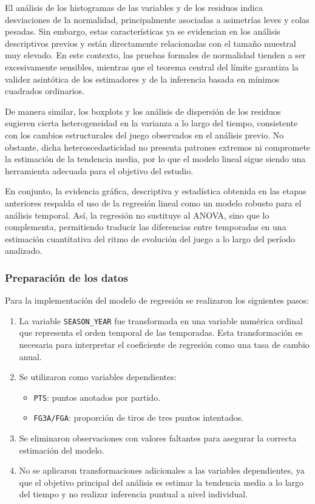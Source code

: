 \documentclass[12pt]{article}
\begin{document}


El análisis de los histogramas de las variables y de los residuos indica desviaciones de la
normalidad, principalmente asociadas a asimetrías leves y colas pesadas. Sin embargo, estas
características ya se evidencian en los análisis descriptivos previos y están directamente
relacionadas con el tamaño muestral muy elevado. En este contexto, las pruebas formales de
normalidad tienden a ser excesivamente sensibles, mientras que el teorema central del límite
garantiza la validez asintótica de los estimadores y de la inferencia basada en mínimos
cuadrados ordinarios.

De manera similar, los boxplots y los análisis de dispersión de los residuos sugieren cierta
heterogeneidad en la varianza a lo largo del tiempo, consistente con los cambios
estructurales del juego observados en el análisis previo. No obstante, dicha
heteroscedasticidad no presenta patrones extremos ni compromete la estimación de la
tendencia media, por lo que el modelo lineal sigue siendo una herramienta adecuada para el
objetivo del estudio.

En conjunto, la evidencia gráfica, descriptiva y estadística obtenida en las etapas
anteriores respalda el uso de la regresión lineal como un modelo robusto para
el análisis temporal. Así, la regresión no sustituye al ANOVA, sino que lo complementa,
permitiendo traducir las diferencias entre temporadas en una estimación cuantitativa del
ritmo de evolución del juego a lo largo del período analizado.





\subsubsection{Preparación de los datos}

Para la implementación del modelo de regresión se realizaron los siguientes pasos:

\begin{enumerate}
    \item La variable \texttt{SEASON\_YEAR} fue transformada en una variable numérica ordinal que representa el orden temporal de las temporadas. Esta transformación es necesaria para interpretar el coeficiente de regresión como una tasa de cambio anual.
    \item Se utilizaron como variables dependientes:
    \begin{itemize}
        \item \texttt{PTS}: puntos anotados por partido.
        \item \texttt{FG3A/FGA}: proporción de tiros de tres puntos intentados.
    \end{itemize}
    \item Se eliminaron observaciones con valores faltantes para asegurar la correcta estimación del modelo.
    \item No se aplicaron transformaciones adicionales a las variables dependientes, ya que el objetivo principal del análisis es estimar la tendencia media a lo largo del tiempo y no realizar inferencia puntual a nivel individual.
\end{enumerate}
\end{document}
